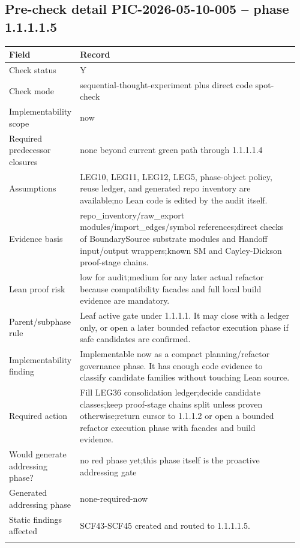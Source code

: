 \subsection*{Pre-check detail PIC-2026-05-10-005 -- phase 1.1.1.1.5}
\begin{longtable}{L{0.18\linewidth} L{0.78\linewidth}}
\hline
\textbf{Field} & \textbf{Record}\\
\hline
Check status & Y\\
\hline\addlinespace[0.20em]
Check mode & sequential-thought-experiment plus direct code spot-check\\
\hline\addlinespace[0.20em]
Implementability scope & now\\
\hline\addlinespace[0.20em]
Required predecessor closures & none beyond current green path through 1.1.1.1.4\\
\hline\addlinespace[0.20em]
Assumptions & LEG10, LEG11, LEG12, LEG5, phase-object policy, reuse ledger, and generated repo inventory are available;\newline no Lean code is edited by the audit itself.\\
\hline\addlinespace[0.20em]
Evidence basis & repo\_inventory/\allowbreak{}raw\_export modules/\allowbreak{}import\_edges/\allowbreak{}symbol references;\newline direct checks of BoundarySource substrate modules and Handoff input/\allowbreak{}output wrappers;\newline known SM and Cayley-Dickson proof-stage chains.\\
\hline\addlinespace[0.20em]
Lean proof risk & low for audit;\newline medium for any later actual refactor because compatibility facades and full local build evidence are mandatory.\\
\hline\addlinespace[0.20em]
Parent/\allowbreak{}subphase rule & Leaf active gate under 1.1.1.1. It may close with a ledger only, or open a later bounded refactor execution phase if safe candidates are confirmed.\\
\hline\addlinespace[0.20em]
Implementability finding & Implementable now as a compact planning/\allowbreak{}refactor governance phase. It has enough code evidence to classify candidate families without touching Lean source.\\
\hline\addlinespace[0.20em]
Required action & Fill LEG36 consolidation ledger;\newline decide candidate classes;\newline keep proof-stage chains split unless proven otherwise;\newline return cursor to 1.1.1.2 or open a bounded refactor execution phase with facades and build evidence.\\
\hline\addlinespace[0.20em]
Would generate addressing phase? & no red phase yet;\newline this phase itself is the proactive addressing gate\\
\hline\addlinespace[0.20em]
Generated addressing phase & none-required-now\\
\hline\addlinespace[0.20em]
Static findings affected & SCF43-SCF45 created and routed to 1.1.1.1.5.\\
\hline\addlinespace[0.20em]
\end{longtable}
